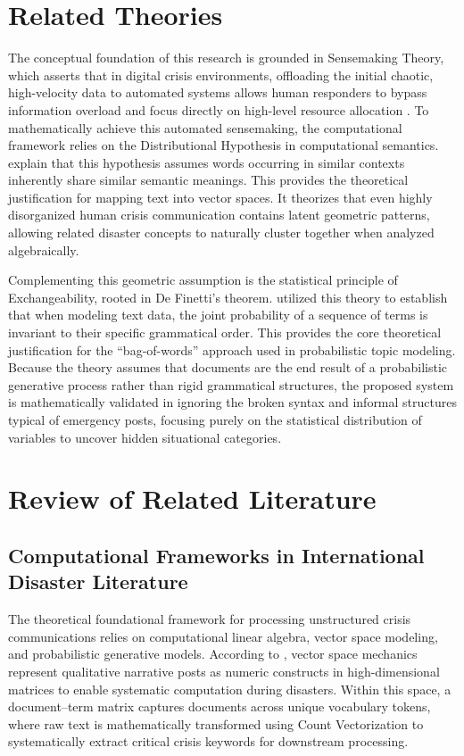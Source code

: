 \documentclass[12pt,a4paper]{report}
\begin{document}
\section{Related Theories}

The conceptual foundation of this research is grounded in Sensemaking Theory,
which asserts that in digital crisis environments, offloading the initial
chaotic, high-velocity data to automated systems allows human responders to
bypass information overload and focus directly on high-level resource
allocation \parencite{pezanowski2022}. To mathematically achieve this automated
sensemaking, the computational framework relies on the Distributional Hypothesis
in computational semantics. \parencite{balkir2016} explain that this hypothesis
assumes words occurring in similar contexts inherently share similar semantic
meanings. This provides the theoretical justification for mapping text into
vector spaces. It theorizes that even highly disorganized human crisis
communication contains latent geometric patterns, allowing related disaster
concepts to naturally cluster together when analyzed algebraically.

Complementing this geometric assumption is the statistical principle of
Exchangeability, rooted in De Finetti's theorem. \parencite{blei2003} utilized
this theory to establish that when modeling text data, the joint probability of
a sequence of terms is invariant to their specific grammatical order. This
provides the core theoretical justification for the ``bag-of-words'' approach
used in probabilistic topic modeling. Because the theory assumes that documents
are the end result of a probabilistic generative process rather than rigid
grammatical structures, the proposed system is mathematically validated in
ignoring the broken syntax and informal structures typical of emergency posts,
focusing purely on the statistical distribution of variables to uncover hidden
situational categories.

\section{Review of Related Literature}

\subsection{Computational Frameworks in International Disaster Literature}

The theoretical foundational framework for processing unstructured crisis
communications relies on computational linear algebra, vector space modeling,
and probabilistic generative models. According to \parencite{mihunov2022}, vector
space mechanics represent qualitative narrative posts as numeric constructs in
high-dimensional matrices to enable systematic computation during disasters.
Within this space, a document--term matrix captures documents across unique
vocabulary tokens, where raw text is mathematically transformed using Count
Vectorization to systematically extract critical crisis keywords for downstream
processing.
\end{document}
